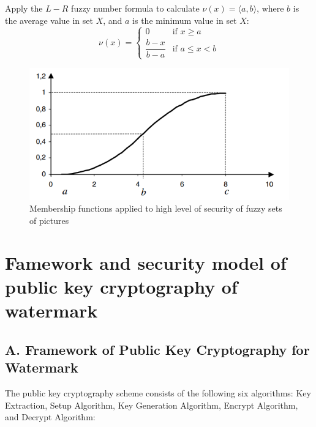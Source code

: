 \documentclass[graybox]{svmult}
\begin{document}
\begin{enumerate}[label=(\roman*), itemsep=1em]
          Apply the \( L - R \) fuzzy number formula to calculate \( \nu(x) = \langle a, b \rangle \), where \( b \) is the average value in set \( X \), and \( a \) is the minimum value in set \( X \):
          \[
              \nu(x) = \begin{cases}
                  0                & \text{if } x \geq a     \\
                  \dfrac{b-x}{b-a} & \text{if } a \leq x < b
              \end{cases}
          \]

\end{enumerate}


\begin{figure}[H]
    \centering
    \includegraphics[width=\textwidth, keepaspectratio]{Figure1.png} %
    \caption{Membership functions applied to high level of security of fuzzy sets of pictures}
    \label{fig:membership-functions-security}
\end{figure}

\section{Famework and security model of public key cryptography of watermark}
\subsection*{A. Framework of Public Key Cryptography for Watermark}

The public key cryptography scheme consists of the following six algorithms: Key Extraction, Setup Algorithm, Key Generation Algorithm, Encrypt Algorithm, and Decrypt Algorithm:
\end{document}
